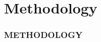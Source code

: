 \documentclass[10pt, aspectratio=169,t,xcolor=table]{beamer}
\begin{document}
%
%

\section{Methodology}
\begin{frame}{}
	\frametitle{METHODOLOGY}
\end{frame}
\end{document}
